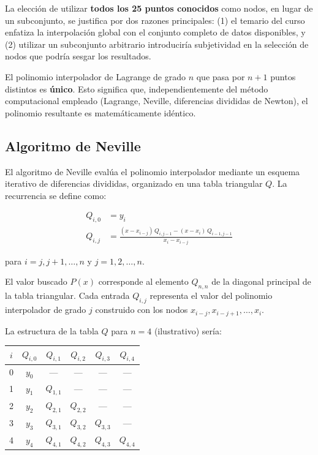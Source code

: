 \documentclass[12pt, letterpaper]{article}
\begin{document}
La elección de utilizar \textbf{todos los 25 puntos conocidos} como nodos, en lugar de un subconjunto, se justifica por dos razones principales: (1) el temario del curso enfatiza la interpolación global con el conjunto completo de datos disponibles, y (2) utilizar un subconjunto arbitrario introduciría subjetividad en la selección de nodos que podría sesgar los resultados.

\begin{tcolorbox}[colback=blue!5!white, colframe=blue!60!black, title=Propiedad fundamental]
El polinomio interpolador de Lagrange de grado $n$ que pasa por $n+1$ puntos distintos es \textbf{único}. Esto significa que, independientemente del método computacional empleado (Lagrange, Neville, diferencias divididas de Newton), el polinomio resultante es matemáticamente idéntico.
\end{tcolorbox}

\subsection{Algoritmo de Neville}\label{subsec:neville}

El algoritmo de Neville evalúa el polinomio interpolador mediante un esquema iterativo de diferencias divididas, organizado en una tabla triangular $Q$. La recurrencia se define como:

\begin{align}
Q_{i,0} &= y_i \label{eq:neville-init} \\
Q_{i,j} &= \frac{(x - x_{i-j})\,Q_{i,j-1} - (x - x_i)\,Q_{i-1,j-1}}{x_i - x_{i-j}} \label{eq:neville-rec}
\end{align}

para $i = j, j+1, \ldots, n$ y $j = 1, 2, \ldots, n$.

El valor buscado $P(x)$ corresponde al elemento $Q_{n,n}$ de la diagonal principal de la tabla triangular. Cada entrada $Q_{i,j}$ representa el valor del polinomio interpolador de grado $j$ construido con los nodos $x_{i-j}, x_{i-j+1}, \ldots, x_i$.

La estructura de la tabla $Q$ para $n=4$ (ilustrativo) sería:
\begin{center}
\begin{tabular}{c|ccccc}
$i$ & $Q_{i,0}$ & $Q_{i,1}$ & $Q_{i,2}$ & $Q_{i,3}$ & $Q_{i,4}$ \\
\hline
0 & $y_0$ & --- & --- & --- & --- \\
1 & $y_1$ & $Q_{1,1}$ & --- & --- & --- \\
2 & $y_2$ & $Q_{2,1}$ & $Q_{2,2}$ & --- & --- \\
3 & $y_3$ & $Q_{3,1}$ & $Q_{3,2}$ & $Q_{3,3}$ & --- \\
4 & $y_4$ & $Q_{4,1}$ & $Q_{4,2}$ & $Q_{4,3}$ & $Q_{4,4}$ \\
\end{tabular}
\end{center}
\end{document}
